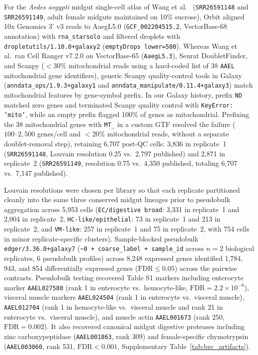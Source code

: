 \documentclass[11pt,letterpaper]{article}
\newcommand{\tool}[1]{\textsf{#1}}
\begin{document}
For the \textit{Aedes aegypti} midgut single-cell atlas of Wang et al.\ \cite{wang2024} (\texttt{SRR26591148} and \texttt{SRR26591149}, adult female midguts maintained on 10\% sucrose), \tool{Orbit} aligned 10x Genomics 3' v3 reads to AaegL5.0 (\nolinkurl{GCF_002204515.2}, VectorBase-68 annotation) with \nolinkurl{rna_starsolo} and filtered droplets with \nolinkurl{dropletutils/1.10.0+galaxy2} (\texttt{emptyDrops lower=500}). Whereas Wang et al.\ ran \tool{Cell Ranger} v7.2.0 on VectorBase-65 (\texttt{AaegL5.3}), \tool{Seurat} \tool{DoubletFinder}, and \tool{Scanpy} ($< 30\%$ mitochondrial reads using a hard-coded list of 38 \texttt{AAEL} mitochondrial gene identifiers), generic \tool{Scanpy} quality-control tools in Galaxy (\nolinkurl{anndata_ops/1.9.3+galaxy1} and \nolinkurl{anndata_manipulate/0.11.4+galaxy3}) match mitochondrial features by gene-symbol prefix. In our Galaxy history, prefix \texttt{ND} matched zero genes and terminated \tool{Scanpy} quality control with \texttt{KeyError: 'mito'}, while an empty prefix flagged 100\% of genes as mitochondrial. Prefixing the 38 mitochondrial genes with \texttt{MT\_} in a custom GTF resolved the failure ($100\text{--}2{,}500$ genes/cell and $< 20\%$ mitochondrial reads, without a separate doublet-removal step), retaining 6,707 post-QC cells: 3,836 in replicate~1 (\texttt{SRR26591148}, Louvain resolution 0.25 vs.\ 2,797 published) and 2,871 in replicate~2 (\texttt{SRR26591149}, resolution 0.75 vs.\ 4,350 published, totaling 6,707 vs.\ 7,147 published).

Louvain resolutions were chosen per library so that each replicate partitioned cleanly into the same three conserved midgut lineages prior to pseudobulk aggregation across 5,953 cells (\texttt{EC/digestive broad}: 3,331 in replicate~1 and 2,004 in replicate~2, \texttt{HC-like/epithelial}: 73 in replicate~1 and 213 in replicate~2, and \texttt{VM-like}: 257 in replicate~1 and 75 in replicate~2, with 754 cells in minor replicate-specific clusters). Sample-blocked pseudobulk \nolinkurl{edger/3.36.0+galaxy7} (\texttt{\textasciitilde 0 + coarse\_label + sample\_id} across $n = 2$ biological replicates, 6 pseudobulk profiles) across 8,248 expressed genes identified 1,784, 943, and 854 differentially expressed genes ($\text{FDR} \le 0.05$) across the pairwise contrasts. Pseudobulk testing recovered Table S1 markers including enterocyte marker \texttt{AAEL027580} (rank 1 in enterocyte vs.\ hemocyte-like, $\text{FDR} = 2.2 \times 10^{-6}$), visceral muscle markers \texttt{AAEL024504} (rank 1 in enterocyte vs.\ visceral muscle), \texttt{AAEL012704} (rank 1 in hemocyte-like vs.\ visceral muscle and rank 21 in enterocyte vs.\ visceral muscle), and muscle actin \texttt{AAEL001673} (rank 250, $\text{FDR} = 0.002$). It also recovered canonical midgut digestive proteases including zinc carboxypeptidase (\texttt{AAEL001863}, rank 309) and female-specific chymotrypsin (\texttt{AAEL003060}, rank 531, $\text{FDR} < 0.001$, Supplementary Table~\ref{tab:brc_artifacts}).
\end{document}
